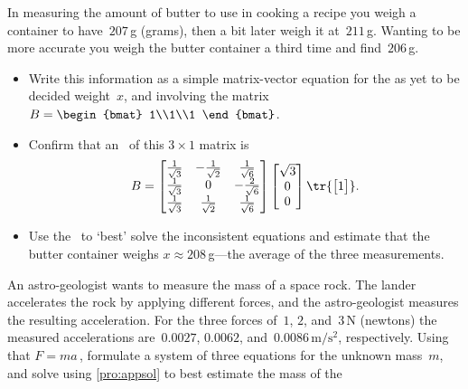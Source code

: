\begin{exercise}  
In measuring the amount of butter to use in cooking a recipe you weigh a container to have~\(207\)\,g (grams), then a bit later weigh it at~\(211\)\,g.  
Wanting to be more accurate you weigh the butter container a third time and find~\(206\)\,g.
\begin{itemize}
\item Write this information as a simple matrix-vector equation for the as yet to be decided weight~\(x\), and involving the matrix \(B=\begin{bmat} 1\\1\\1 \end{bmat}\).
\item Confirm that an \svd\ of this \(3\times1\) matrix is
\begin{equation*}
B=\begin{bmatrix} \frac1{\sqrt3}&-\frac1{\sqrt2}&\frac1{\sqrt6}
\\\frac1{\sqrt3}&0&-\frac2{\sqrt6}
\\\frac1{\sqrt3}&\frac1{\sqrt2}&\frac1{\sqrt6}\end{bmatrix}
\begin{bmatrix} \sqrt3\\0\\0 \end{bmatrix}
\tr{\begin{bmatrix} 1 \end{bmatrix}}.
\end{equation*}
\item Use the \svd\ to `best' solve the inconsistent equations and estimate that the butter container weighs \(x\approx 208\)\,g---the average of the three measurements.
\end{itemize}
\end{exercise}


\begin{comment}
Some of the following adapted from Chong, Ch.~12.
\end{comment}


\begin{exercise}  
An astro-geologist wants to measure the mass of a space rock.
The lander accelerates the rock by applying different forces, and the astro-geologist measures the resulting acceleration.
For the three forces of~\(1\), \(2\), and~\(3\)\,N (newtons) the measured accelerations are~\(0.0027\), \(0.0062\), and~\(0.0086\,\text{m}/\text{s}^2\), respectively. 
Using  that \(F=ma\)\,, formulate a system of three equations for the unknown mass~\(m\), and solve using \cref{pro:appsol} to best estimate the mass of the 
\end{exercise}


